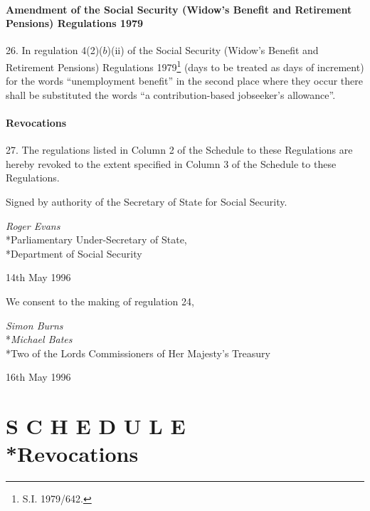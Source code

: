 \documentclass[a4paper]{article}
\newcommand{\parthead}{}
\begin{document}
\subsection[26. Amendment of the Social Security (Widow’s Benefit and Retirement Pensions) Regulations 1979]{Amendment of the Social Security (Widow’s Benefit and Retirement Pensions) Regulations 1979}

26.  In regulation 4(2)($b$)(ii) of the Social Security (Widow’s Benefit and Retirement Pensions) Regulations 1979\footnote{\frenchspacing S.I. 1979/642.} (days to be treated as days of increment) for the words “unemployment benefit” in the second place where they occur there shall be substituted the words “a contribution-based jobseeker’s allowance”.

\subsection[27. Revocations]{Revocations}

27.  The regulations listed in Column 2 of the Schedule to these Regulations are hereby revoked to the extent specified in Column 3 of the Schedule to these Regulations.

\bigskip

Signed by authority of the Secretary of State for Social Security.

{\raggedleft
\emph{Roger Evans}\\*Parliamentary Under-Secretary of State,\\*Department of Social Security

}

14th May 1996

\bigskip

We consent to the making of regulation 24,

{\raggedleft
\emph{Simon Burns}\\*\emph{Michael Bates}\\*Two of the Lords Commissioners of Her Majesty’s Treasury

}

16th May 1996

\clearpage

\part[Schedule --- Revocations]{S C H E D U L E\\*Revocations}

\renewcommand\parthead{--- Schedule}
\end{document}
